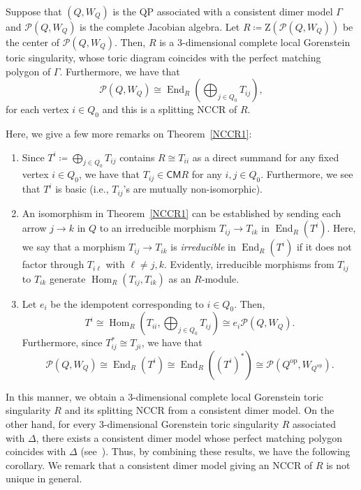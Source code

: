 \documentclass[ALCO,ThmDefs,Unicode]{cedram}
\newcommand{\rmZ}{\mathrm{Z}}
\newcommand{\calP}{\mathcal{P}}
\DeclareMathOperator{\op}{op}
\DeclareMathOperator{\Hom}{Hom}
\DeclareMathOperator{\End}{End}
\newcommand{\CM}{\mathsf{CM}}
\begin{document}
\begin{theo}\label{NCCR1}
Suppose that $(Q, W_Q)$ is the QP associated with a consistent dimer model $\Gamma$ and $\calP(Q, W_Q)$ is the complete Jacobian algebra. Let $R\coloneqq \rmZ(\calP(Q, W_Q))$ be the center of $\calP(Q, W_Q)$. Then, $R$ is a $3$-dimensional complete local Gorenstein toric singularity, whose toric diagram coincides with the perfect matching polygon of $\Gamma$. Furthermore, we have that
\[
\calP(Q, W_Q)\cong\End_R\left(\bigoplus_{j\in Q_0}T_{ij}\right),
\]
for each vertex $i\in Q_0$ and this is a splitting NCCR of $R$.
\end{theo}


\begin{rema}\label{rem_NCCR}
Here, we give a few more remarks on Theorem~\ref{NCCR1}:
\begin{enumerate}%
\item Since $T^i\coloneqq\bigoplus_{j\in Q_0}T_{ij}$ contains $R\cong T_{ii}$ as a direct summand for any fixed vertex $i\in Q_0$, we have that $T_{ij}\in\CM R$ for any $i, j \in Q_0$. Furthermore, we see that $T^i$ is basic (i.e., $T_{ij}$'s are mutually non-isomorphic).

\item An isomorphism in Theorem~\ref{NCCR1} can be established by sending each arrow $j\rightarrow k$ in $Q$ to an irreducible morphism $T_{ij}\rightarrow T_{ik}$ in $\End_R(T^i)$. Here, we say that a morphism $T_{ij}\rightarrow T_{ik}$ is \emph{irreducible} in $\End_R(T^i)$ if it does not factor through $T_{i\ell}$ with $\ell\neq j,k$. Evidently, irreducible morphisms from $T_{ij}$ to $T_{ik}$ generate $\Hom_R(T_{ij},T_{ik})$ as an $R$-module.

\item Let $e_i$ be the idempotent corresponding to $i\in Q_0$. Then,
\[
T^i\cong\Hom_R\left(T_{ii},\bigoplus_{j\in Q_0}T_{ij}\right)\cong e_i\calP(Q, W_Q).
\]
Furthermore, since $T_{ij}^* \cong T_{ji}$, we have that
\[
\calP(Q, W_Q)\cong\End_R(T^i)\cong\End_R((T^i)^*)\cong\calP(Q^{\op}, W_{Q^{\op}}).
\]
\end{enumerate}
\end{rema}

In this manner, we obtain a $3$-dimensional complete local Gorenstein toric singularity $R$ and its splitting NCCR from a consistent dimer model. On the other hand, for every $3$-dimensional Gorenstein toric singularity $R$ associated with $\Delta$, there exists a consistent dimer model whose perfect matching polygon coincides with $\Delta$ (see~\cite{Gul,IU2}). Thus, by combining these results, we have the following corollary. We remark that a consistent dimer model giving an NCCR of $R$ is not unique in general.
\end{document}
